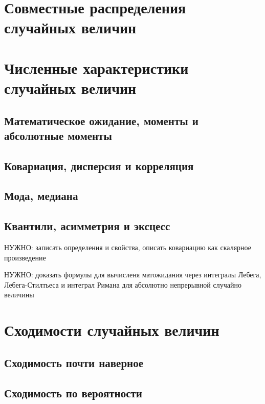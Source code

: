 \documentclass[12pt]{article}
\numberwithin{theorem}{section}
\theoremstyle{definition}
\newcommand{\TODO}[1]{\textcolor{todocolor}{НУЖНО: #1}}
\begin{document}
	\section{Совместные распределения случайных величин}
	
	
	
	
	\section{Численные характеристики случайных величин}
	
	\subsection{Математическое ожидание, моменты и абсолютные моменты}
	
	\subsection{Ковариация, дисперсия и корреляция}
	
	\subsection{Мода, медиана}
	
	\subsection{Квантили, асимметрия и эксцесс}
	
	\TODO{записать определения и свойства, описать ковариацию как скалярное произведение}
	
	\TODO{доказать формулы для вычисленя матожидания через интегралы Лебега, Лебега-Стилтьеса и интеграл Римана для абсолютно непрерывной случайно величины}
	
	
	
	\section{Сходимости случайных величин}
	
	\subsection{Сходимость почти наверное}
	
	\subsection{Сходимость по вероятности}
	
\end{document}
